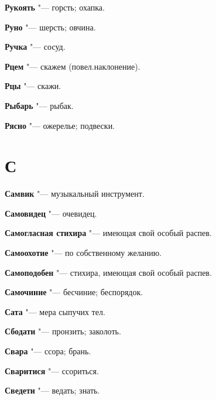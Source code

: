 \begin{mymulticols}{2}
\noindent\textbf{Рукоять} "--- горсть; охапка. 




\noindent\textbf{Руно} "--- шерсть; овчина. 




\noindent\textbf{Ручка} "--- сосуд. 




\noindent\textbf{Рцем} "--- скажем (повел.наклонение). 




\noindent\textbf{Рцы} "--- скажи. 




\noindent\textbf{Рыбарь} "--- рыбак. 




\noindent\textbf{Рясно} "--- ожерелье; подвески. 




\section{С}





\noindent\textbf{Самвик} "--- музыкальный инструмент. 




\noindent\textbf{Самовидец} "--- очевидец. 




\noindent\textbf{Самогласная стихира} "--- имеющая свой особый распев. 




\noindent\textbf{Самоохотие} "--- по собственному желанию. 




\noindent\textbf{Самоподобен} "--- стихира, имеющая свой особый распев. 




\noindent\textbf{Самочиние} "--- бесчиние; беспорядок. 




\noindent\textbf{Сата} "--- мера сыпучих тел. 




\noindent\textbf{Сбодати} "--- пронзить; заколоть. 




\noindent\textbf{Свара} "--- ссора; брань. 




\noindent\textbf{Сваритися} "--- ссориться. 




\noindent\textbf{Сведети} "--- ведать; знать. 





\end{mymulticols}
